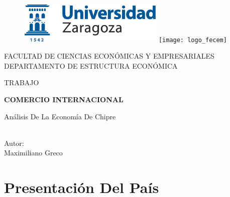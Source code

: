 \documentclass[a4paper,openright,12pt]{book}
\begin{document}
\pagestyle{empty}
\begin{titlepage}

\begin{center}
\vspace*{-1in}
\begin{figure}[htb]
\begin{center}
\includegraphics[height=2cm]{logo_uz}
\hfill
\texttt{[image: logo\_fecem]}
\end{center}
\end{figure}
\vspace*{0.15in}
FACULTAD DE CIENCIAS ECONÓMICAS Y EMPRESARIALES \\
\vspace*{0.15in}
DEPARTAMENTO DE ESTRUCTURA ECONÓMICA\\
\vspace*{0.6in}
\begin{large}
TRABAJO\\
\end{large}
\vspace*{0.2in}
\begin{Large}
\textbf{COMERCIO INTERNACIONAL} \\
\end{Large}
\vspace*{0.3in}
\begin{large}
Análisis De La Economía De Chipre \\ 
\end{large}
\vspace*{0.3in}
\begin{large}
Autor: \\
Maximiliano Greco \\
\end{large}
\end{center}

\end{titlepage}

\newpage



\chapter{Presentación Del País}
\label{cap1}
\end{document}
